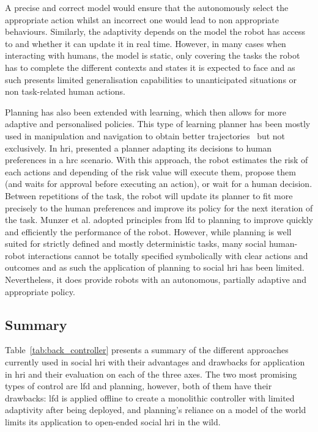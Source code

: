     A precise and correct model would ensure that the autonomously select the appropriate action whilst an incorrect one would lead to non appropriate behaviours. Similarly, the adaptivity depends on the model the robot has access to and whether it can update it in real time. However, in many cases when interacting with humans, the model is static, only covering the tasks the robot has to complete the different contexts and states it is expected to face and as such presents limited generalisation capabilities to unanticipated situations or non task-related human actions.
    
    Planning has also been extended with learning, which then allows for more adaptive and personalised policies. This type of learning planner has been mostly used in manipulation and navigation to obtain better trajectories~\citep{jain2013learning,beetz2004rpllearn} but not exclusively. In \gls{hri}, \cite{munzer2017efficient} presented a planner adapting its decisions to human preferences in a \gls{hrc} scenario. With this approach, the robot estimates the risk of each actions and depending of the risk value will execute them, propose them (and waits for approval before executing an action), or wait for a human decision. Between repetitions of the task, the robot will update its planner to fit more precisely to the human preferences and improve its policy for the next iteration of the task. Munzer et al. adopted principles from \gls{lfd} to planning to improve quickly and efficiently the performance of the robot. However, while planning is well suited for strictly defined and mostly deterministic tasks, many social human-robot interactions cannot be totally specified symbolically with clear actions and outcomes and as such the application of planning to social \gls{hri} has been limited. Nevertheless, it does provide robots with an autonomous, partially adaptive and appropriate policy.
		
\subsection{Summary}

	Table~\ref{tab:back_controller} presents a summary of the different approaches currently used in social \gls{hri} with their advantages and drawbacks for application in \gls{hri} and their evaluation on each of the three axes. The two most promising types of control are \gls{lfd} and planning, however, both of them have their drawbacks: \gls{lfd} is applied offline to create a monolithic controller with limited adaptivity after being deployed, and planning's reliance on a model of the world limits its application to open-ended social \gls{hri} in the wild.
	
